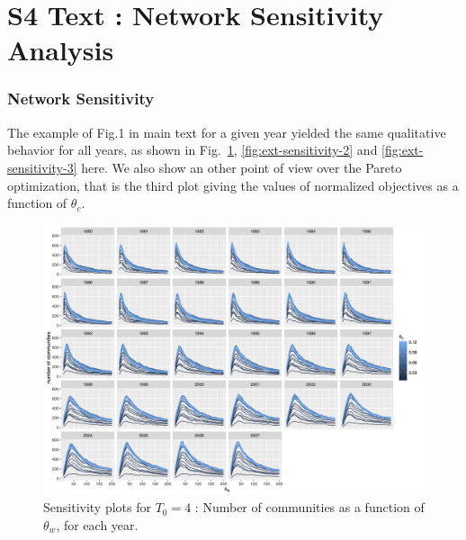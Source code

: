 



\section*{S4 Text : Network Sensitivity Analysis \label{app:sensitivity}}


\subsubsection*{Network Sensitivity}

The example of Fig.1 in main text for a given year yielded the same qualitative behavior for all years, as shown in Fig.~\ref{fig:ext-sensitivity-1}, \ref{fig:ext-sensitivity-2} and \ref{fig:ext-sensitivity-3} here.  We also show an other point of view over the Pareto optimization, that is the third plot giving the values of normalized objectives as a function of $\theta_c$.


\begin{figure}
\centering
\includegraphics[width=\textheight,height=\textwidth,angle=90]{figures/commnum_thetaw_byyears.png}
\caption{Sensitivity plots for $T_0 = 4$ : Number of communities as a function of $\theta_w$, for each year.}
\label{fig:ext-sensitivity-1}
\end{figure}

